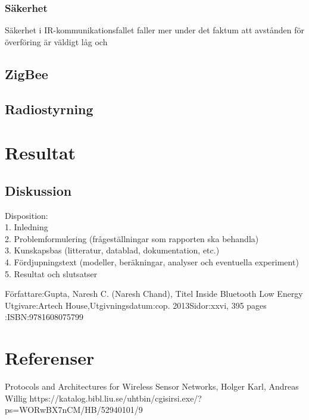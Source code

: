 \documentclass[a4paper,12pt,fleqn]{article}
\begin{document}
\subsubsection{Säkerhet}
Säkerhet i IR-kommunikationsfallet faller mer under det faktum att avstånden för överföring är väldigt låg och 

\subsection{ZigBee}
\subsection{Radiostyrning}
\section{Resultat}
\subsection{Diskussion}

Disposition: 
\\
1. Inledning 
\\
2. Problemformulering (frågeställningar som rapporten ska behandla) 
\\
3. Kunskapsbas (litteratur, datablad, dokumentation, etc.) 
\\
4. Fördjupningstext (modeller, beräkningar, analyser och eventuella experiment) 
\\
5. Resultat och slutsatser 






\newpage
\appendix
Författare:Gupta, Naresh C. (Naresh Chand), Titel Inside Bluetooth Low Energy Utgivare:Artech House,Utgivningsdatum:cop. 2013Sidor:xxvi, 395 pages :ISBN:9781608075799
\pagestyle{empty}
\section{Referenser}
Protocols and Architectures for Wireless Sensor Networks, Holger Karl, Andreas Willig
https://katalog.bibl.liu.se/uhtbin/cgisirsi.exe/?ps=WORwBX7nCM/HB/52940101/9
\end{document}
